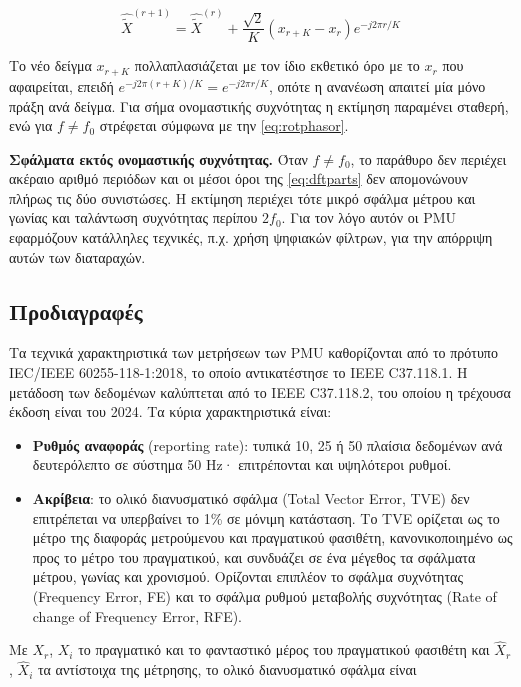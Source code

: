 \begin{equation}
\hat{\tilde{X}}^{(r+1)} = \hat{\tilde{X}}^{(r)}
+ \frac{\sqrt{2}}{K}\left(x_{r+K} - x_r\right) e^{-j2\pi r/K}
\label{eq:recdft}
\end{equation}

Το νέο δείγμα $x_{r+K}$ πολλαπλασιάζεται με τον ίδιο εκθετικό όρο με το $x_r$ που αφαιρείται,
επειδή $e^{-j2\pi(r+K)/K} = e^{-j2\pi r/K}$, οπότε η ανανέωση απαιτεί μία μόνο πράξη ανά
δείγμα. Για σήμα ονομαστικής συχνότητας η εκτίμηση παραμένει σταθερή, ενώ για $f \neq f_0$
στρέφεται σύμφωνα με την \eqref{eq:rotphasor}.

\textbf{Σφάλματα εκτός ονομαστικής συχνότητας.} Όταν $f \neq f_0$, το παράθυρο δεν περιέχει
ακέραιο αριθμό περιόδων και οι μέσοι όροι της \eqref{eq:dftparts} δεν απομονώνουν
πλήρως τις δύο συνιστώσες. Η εκτίμηση περιέχει τότε μικρό σφάλμα μέτρου και γωνίας και ταλάντωση
συχνότητας περίπου $2f_0$. Για τον λόγο αυτόν οι PMU εφαρμόζουν κατάλληλες τεχνικές, π.χ. χρήση ψηφιακών φίλτρων, για την απόρριψη αυτών των διαταραχών.


\subsection{Προδιαγραφές}

Τα τεχνικά χαρακτηριστικά των μετρήσεων των PMU καθορίζονται από το πρότυπο IEC/IEEE
60255-118-1:2018, το οποίο αντικατέστησε το IEEE C37.118.1. Η μετάδοση των δεδομένων
καλύπτεται από το IEEE C37.118.2, του οποίου η τρέχουσα έκδοση είναι του 2024. Τα κύρια
χαρακτηριστικά είναι:

\begin{itemize}
\item \textbf{Ρυθμός αναφοράς} (reporting rate): τυπικά 10, 25 ή 50 πλαίσια δεδομένων ανά
      δευτερόλεπτο σε σύστημα 50 Hz· επιτρέπονται και υψηλότεροι ρυθμοί.
\item \textbf{Ακρίβεια}: το ολικό διανυσματικό σφάλμα (Total Vector Error, TVE) δεν
      επιτρέπεται να υπερβαίνει το 1\% σε μόνιμη κατάσταση. Το TVE ορίζεται ως το μέτρο της
      διαφοράς μετρούμενου και πραγματικού φασιθέτη, κανονικοποιημένο ως προς το μέτρο του
      πραγματικού, και συνδυάζει σε ένα μέγεθος τα σφάλματα μέτρου, γωνίας και χρονισμού.
      Ορίζονται επιπλέον το σφάλμα συχνότητας (Frequency Error, FE) και το σφάλμα ρυθμού
      μεταβολής συχνότητας (Rate of change of Frequency Error, RFE).
\end{itemize}

Με $X_r$, $X_i$ το πραγματικό και το φανταστικό μέρος του πραγματικού φασιθέτη και
$\hat{X}_r$, $\hat{X}_i$ τα αντίστοιχα της μέτρησης, το ολικό διανυσματικό σφάλμα είναι

